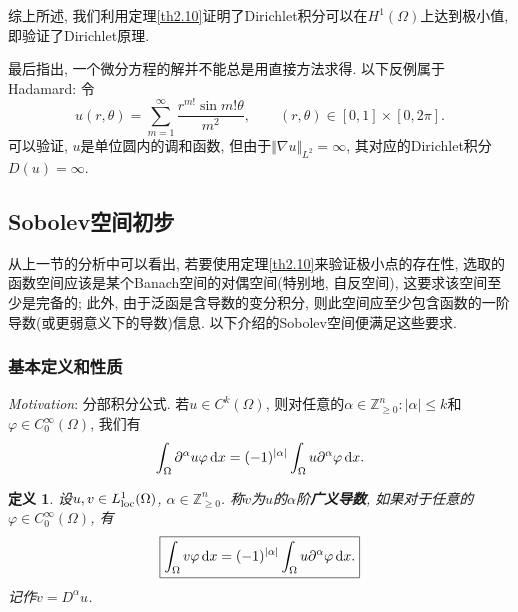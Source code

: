 \documentclass[12pt,a4paper]{article}
\newtheorem{definition}[theorem]{定义}
\begin{document}
综上所述, 我们利用定理\ref{th2.10}证明了Dirichlet积分可以在$H^1(\Omega)$上达到极小值, 即验证了Dirichlet原理.

最后指出, 一个微分方程的解并不能总是用直接方法求得. 以下反例属于Hadamard: 令 
\begin{equation*}
    u(r, \theta) = \sum_{m = 1}^{\infty}\frac{r^{m!}\sin m!\theta}{m^2}, \qquad (r, \theta) \in [0, 1] \times [0, 2\pi].
\end{equation*}
可以验证, $u$是单位圆内的调和函数, 但由于$\Vert \nabla u\Vert_{L^2} = \infty$, 其对应的Dirichlet积分$D(u) = \infty$.

\subsection{Sobolev空间初步}

从上一节的分析中可以看出, 若要使用定理\ref{th2.10}来验证极小点的存在性, 选取的函数空间应该是某个Banach空间的对偶空间(特别地, 自反空间), 这要求该空间至少是完备的;
此外, 由于泛函是含导数的变分积分, 则此空间应至少包含函数的一阶导数(或更弱意义下的导数)信息. 以下介绍的Sobolev空间便满足这些要求.

\subsubsection{基本定义和性质}

\emph{Motivation}: 分部积分公式. 若$u \in C^k(\Omega)$, 则对任意的$\alpha \in \mathbb{Z}^n_{\geq 0}\colon |\alpha| \leq k$和$\varphi \in C_0^{\infty}(\Omega)$, 我们有
\begin{equation*}
    \int_{\Omega}\partial^{\alpha}u\varphi \,{\rm d}x = (-1)^{|\alpha|}\int_{\Omega}u\partial^{\alpha}\varphi \,{\rm d}x.
\end{equation*}

\begin{definition}
    设$u, v \in L^1_{{\rm loc}}(\Omega)$, $\alpha \in \mathbb{Z}^n_{\geq 0}$.
    称$v$为$u$的$\alpha$阶\textbf{广义导数}, 如果对于任意的$\varphi \in C_0^{\infty}(\Omega)$, 有
    \begin{equation*}
        \boxed{\int_{\Omega}v\varphi \,{\rm d}x = (-1)^{|\alpha|}\int_{\Omega}u\partial^{\alpha}\varphi \,{\rm d}x.}
    \end{equation*}
    记作$v = D^{\alpha}u$.
\end{definition}
\end{document}
